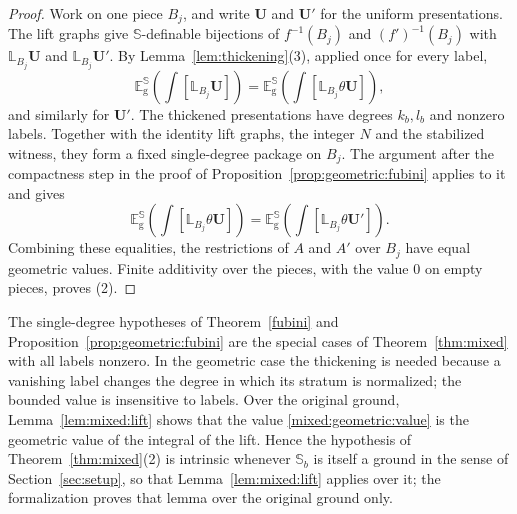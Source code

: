 \begin{proof}
Work on one piece $B_j$, and write $\bm U$ and $\bm U'$ for the uniform
presentations. The lift graphs give $\mathbb S$-definable bijections of
$f^{-1}(B_j)$ and $(f')^{-1}(B_j)$ with $\mathbb L_{B_j}\bm U$ and
$\mathbb L_{B_j}\bm U'$. By Lemma~\ref{lem:thickening}(3), applied once for
every label,
\[
 \mathbb E_{\mathrm g}^{\mathbb S}\!\left(\int[\mathbb L_{B_j}\bm U]\right)
 =\mathbb E_{\mathrm g}^{\mathbb S}\!\left(\int[\mathbb L_{B_j}\theta\bm U]\right),
\]
and similarly for $\bm U'$. The thickened presentations have degrees
$k_b,l_b$ and nonzero labels. Together with the identity lift graphs, the
integer $N$ and the stabilized witness, they form a fixed single-degree
package on $B_j$. The argument after the compactness step in the proof of
Proposition~\ref{prop:geometric:fubini} applies to it and gives
\[
 \mathbb E_{\mathrm g}^{\mathbb S}\!\left(\int[\mathbb L_{B_j}\theta\bm U]\right)
 =\mathbb E_{\mathrm g}^{\mathbb S}\!\left(\int[\mathbb L_{B_j}\theta\bm U']\right).
\]
Combining these equalities, the restrictions of $A$ and $A'$ over $B_j$ have
equal geometric values. Finite additivity over the pieces, with the value
$0$ on empty pieces, proves (2).
\end{proof}

\begin{rem}
The single-degree hypotheses of Theorem~\ref{fubini} and
Proposition~\ref{prop:geometric:fubini} are the special cases of
Theorem~\ref{thm:mixed} with all labels nonzero. In the geometric case the
thickening is needed because a vanishing label changes the degree in which
its stratum is normalized; the bounded value is insensitive to labels.
Over the original ground, Lemma~\ref{lem:mixed:lift} shows that the value
\eqref{mixed:geometric:value} is the geometric value of the integral of the
lift. Hence the hypothesis of Theorem~\ref{thm:mixed}(2) is intrinsic
whenever $\mathbb S_b$ is itself a ground in the sense of
Section~\ref{sec:setup}, so that Lemma~\ref{lem:mixed:lift} applies over
it; the formalization proves that lemma over the original ground only.
\end{rem}
